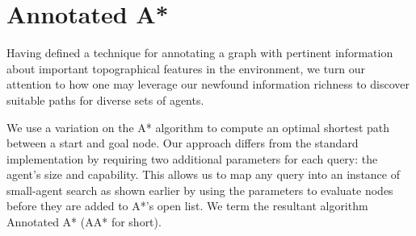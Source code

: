 \section{Annotated A*}
\label{aha:aastar}
Having defined a technique for annotating a graph with pertinent information about important topographical features in the environment, we turn our attention to how one may leverage our newfound information richness to discover suitable paths for diverse sets of agents. 
\par \indent
We use a variation on the A* algorithm \cite{astar} to compute an optimal shortest path between a start and goal node.  
Our approach differs from the standard implementation by requiring two additional parameters for each query: the agent's size and capability. This allows us to map any query into an instance of small-agent search as shown earlier by using the parameters to evaluate nodes before they are added to A*'s open list. We term the resultant algorithm Annotated A* (AA* for short).
